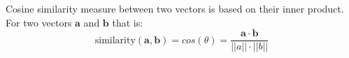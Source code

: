 \documentclass[conference]{IEEEtran}
\begin{document}
Cosine similarity measure between two vectors is based on their inner product. 
For two vectors $\boldsymbol{a}$ and $\boldsymbol{b}$ that is:
\begin{equation}
\mbox{similarity}(\boldsymbol{a},\boldsymbol{b}) = cos(\theta) = \frac{ 
\mathbf{a} \cdot \mathbf{b} } {\left| \left| a \right| \right| \cdot \left| \left| b \right|
\right|}
\end{equation} 

\end{document}
